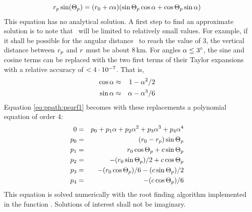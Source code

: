 \begin{equation}
   r_{p} \sin(\Theta_p) = (r_{0}+c\alpha) 
           (\sin\Theta_p \cos\alpha + \cos\Theta_p \sin\alpha)
 \label{eq:ppath:psurf1}
\end{equation}
This equation has no analytical solution. A first step to find an approximate
solution is to note that \Lat\ will be limited to relatively small values. For
example, if it shall be possible for the angular distance \Lat\ to reach the
value of 3\degree, the vertical distance between $r_{p}$ and $r$ must be
about 8\,km. For angles $\alpha \leq 3^\circ$, the sine and cosine terms can be
replaced with the two first terms of their Taylor expansions with a relative
accuracy of $< 4\cdot10^{-7}$. That is,
\begin{eqnarray}
  \cos \alpha & \approx & 1 - \alpha^2 / 2    \nonumber \\
  \sin \alpha & \approx & \alpha - \alpha^3 / 6 \nonumber
\end{eqnarray}
Equation \ref{eq:ppath:psurf1} becomes with these replacements a
polynomial equation of order 4:
\begin{eqnarray}
    0 & = & p_0 + p_1 \alpha + p_2 \alpha^2 + p_3 \alpha^3 + p_4 \alpha^4 \\
  p_0 & = & (r_{0}-r_{p}) \sin\Theta_p \nonumber \\ 
  p_1 & = & r_{0}\cos\Theta_p + c \sin\Theta_p \nonumber \\ 
  p_2 & = & -(r_{0}\sin\Theta_p)/2 + c\cos\Theta_p  \nonumber \\ 
  p_3 & = & -(r_{0}\cos\Theta_p)/6 - (c\sin\Theta_p)/2 \nonumber \\ 
  p_4 & = & -(c \cos\Theta_p)/6  \nonumber 
  \label{eq:ppath:psurf2}
\end{eqnarray}
This equation is solved numerically with the root finding algorithm
implemented in the function . Solutions of
interest shall not be imaginary.


